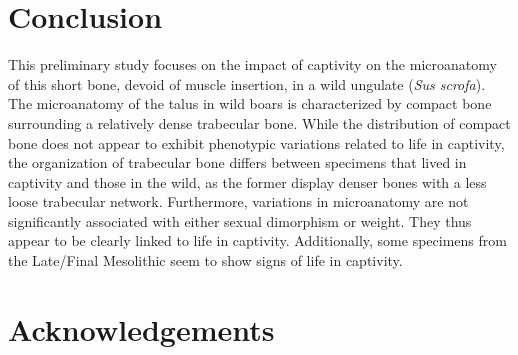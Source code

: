 \documentclass[12pt,a4paper]{article}
\begin{document}
\section{Conclusion}
This preliminary study focuses on the impact of captivity on the microanatomy of this short bone, devoid of muscle insertion, in a wild ungulate (\textit{Sus scrofa}). The microanatomy of the talus in wild boars is characterized by compact bone surrounding a relatively dense trabecular bone. While the distribution of compact bone does not appear to exhibit phenotypic variations related to life in captivity, the organization of trabecular bone differs between specimens that lived in captivity and those in the wild, as the former display denser bones with a less loose trabecular network. Furthermore, variations in microanatomy are not significantly associated with either sexual dimorphism or weight. They thus appear to be clearly linked to life in captivity. Additionally, some specimens from the 
Late/Final Mesolithic seem to show signs of life in captivity. 
\section{Acknowledgements}


 
 
\end{document}
